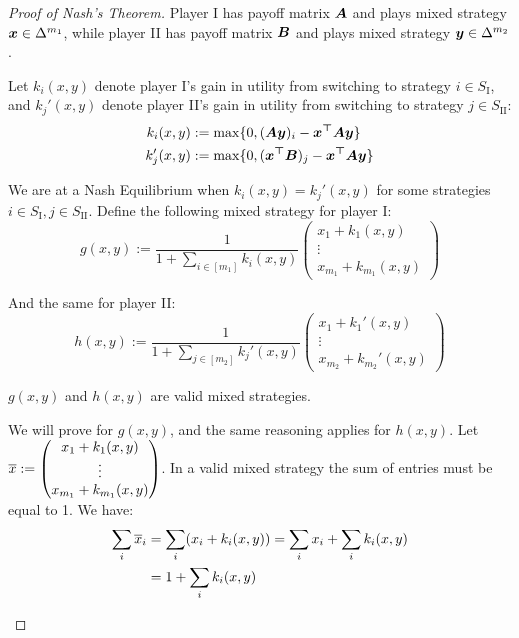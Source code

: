 \begin{proof}[Proof of Nash's Theorem]
	Player I has payoff matrix $\bm{A}$ and plays mixed strategy
	$\bm{x} \in \Delta^{m_1}$, while player II has payoff matrix
	$\bm{B}$ and plays mixed strategy $\bm{y} \in \Delta^{m_2}$.

	Let $k_i(x,y)$ denote player I's gain in utility from switching to
	strategy $i \in S_\text{I}$, and $k_j'(x,y)$ denote player II's gain in
	utility from switching to strategy $j \in S_\text{II}$:
	\begin{equation}
		\begin{split}
			k_i(x,y) & := \max \{ 0, (\bm{Ay})_i - \bm{x^\top A y} \} \\
			k_j'(x,y) & := \max \{ 0, (\bm{x^\top B})_j - \bm{x^\top A y} \} \\
		\end{split}
	\end{equation}

	We are at a Nash Equilibrium when $k_i(x,y) = k_j'(x,y)$ for some
	strategies $i \in S_\text{I}, j \in S_\text{II}$. Define the following
	mixed strategy for player I:
	\begin{equation}
		g(x,y) := \frac{1}{1 + \sum_{i \in [m_1]} k_i(x,y)} \begin{pmatrix}
			x_1 + k_1(x,y) \\
			\vdots \\
			x_{m_1} + k_{m_1}(x,y)
		\end{pmatrix}
	\end{equation}

	And the same for player II:
	\begin{equation}
		h(x,y) := \frac{1}{1 + \sum_{j \in [m_2]} k_j'(x,y)} \begin{pmatrix}
			x_1 + k_1'(x,y) \\
			\vdots \\
			x_{m_2} + k_{m_2}'(x,y)
		\end{pmatrix}
	\end{equation}

	\begin{claim*}
		$g(x,y)$ and $h(x,y)$ are valid mixed strategies.
	\end{claim*}
	\begin{subproof}
		We will prove for $g(x,y)$, and the same reasoning applies for
		$h(x,y)$.  Let $\overline{x} := \begin{pmatrix}
			x_1 + k_1(x,y) \\
			\vdots \\
			x_{m_1} + k_{m_1}(x,y) \\
		\end{pmatrix}$. In a valid mixed strategy the sum of entries must
		be equal to 1. We have:
		\begin{equation*}
			\begin{split}
				\sum_i \overline{x}_i & = \sum_i (x_i + k_i(x,y)) = \sum_i x_i +
				\sum_i k_i(x,y) \\
				& = 1 + \sum_i k_i(x,y)
			\end{split}
		\end{equation*}


\end{subproof}
\end{proof}
